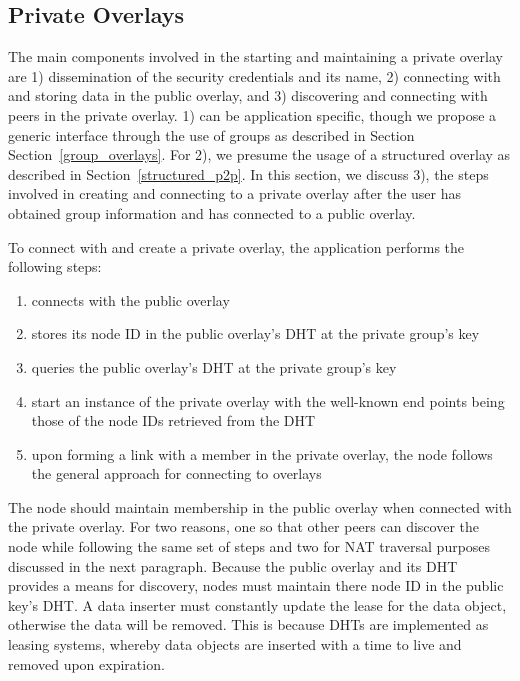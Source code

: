 \documentclass[conference]{IEEEtran}
\begin{document}
\subsection{Private Overlays}
The main components involved in the starting and maintaining a private overlay
are 1) dissemination of the security credentials and its name, 2) connecting
with and storing data in the public overlay, and 3) discovering and connecting
with peers in the private overlay.  1) can be application specific, though we
propose a generic interface through the use of groups as described in Section
Section~\ref{group_overlays}.  For 2), we presume the usage of a structured
overlay as described in Section~\ref{structured_p2p}.  In this section, we
discuss 3), the steps involved in creating and connecting to a private overlay
after the user has obtained group information and has connected to a public
overlay.

To connect with and create a private overlay, the application performs the
following steps:
\begin{enumerate}
\setlength{\itemsep}{0pt}
\setlength{\parskip}{0pt}
\item connects with the public overlay
\item stores its node ID in the public overlay's DHT at the private group's key
\item queries the public overlay's DHT at the private group's key
\item start an instance of the private overlay with the well-known end points
being those of the node IDs retrieved from the DHT
\item upon forming a link with a member in the private overlay, the node follows
the general approach for connecting to overlays
\end{enumerate}

The node should maintain membership in the public overlay when connected with
the private overlay.  For two reasons, one so that other peers can discover the
node while following the same set of steps and two for NAT traversal purposes
discussed in the next paragraph.  Because the public overlay and its DHT
provides a means for discovery, nodes must maintain there node ID in the public
key's DHT.  A data inserter must constantly update the lease for the data
object, otherwise the data will be removed.  This is because DHTs are
implemented as leasing systems, whereby data objects are inserted with a time
to live and removed upon expiration.
\end{document}
